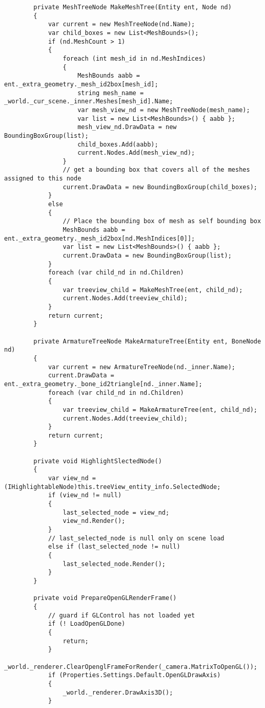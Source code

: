 \begin{scriptsize}
\begin{verbatim}
        private MeshTreeNode MakeMeshTree(Entity ent, Node nd)
        {
            var current = new MeshTreeNode(nd.Name);
            var child_boxes = new List<MeshBounds>();
            if (nd.MeshCount > 1)
            {
                foreach (int mesh_id in nd.MeshIndices)
                {
                    MeshBounds aabb = ent._extra_geometry._mesh_id2box[mesh_id];
                    string mesh_name = _world._cur_scene._inner.Meshes[mesh_id].Name;
                    var mesh_view_nd = new MeshTreeNode(mesh_name);
                    var list = new List<MeshBounds>() { aabb };
                    mesh_view_nd.DrawData = new BoundingBoxGroup(list);
                    child_boxes.Add(aabb);
                    current.Nodes.Add(mesh_view_nd);
                }
                // get a bounding box that covers all of the meshes assigned to this node
                current.DrawData = new BoundingBoxGroup(child_boxes);
            }
            else
            {
                // Place the bounding box of mesh as self bounding box
                MeshBounds aabb = ent._extra_geometry._mesh_id2box[nd.MeshIndices[0]];
                var list = new List<MeshBounds>() { aabb };
                current.DrawData = new BoundingBoxGroup(list);
            }
            foreach (var child_nd in nd.Children)
            {
                var treeview_child = MakeMeshTree(ent, child_nd);
                current.Nodes.Add(treeview_child);
            }
            return current;
        }

        private ArmatureTreeNode MakeArmatureTree(Entity ent, BoneNode nd)
        {
            var current = new ArmatureTreeNode(nd._inner.Name);
            current.DrawData = ent._extra_geometry._bone_id2triangle[nd._inner.Name];
            foreach (var child_nd in nd.Children)
            {
                var treeview_child = MakeArmatureTree(ent, child_nd);
                current.Nodes.Add(treeview_child);
            }
            return current;
        }

        private void HighlightSlectedNode()
        {
            var view_nd = (IHighlightableNode)this.treeView_entity_info.SelectedNode;
            if (view_nd != null)
            {
                last_selected_node = view_nd;
                view_nd.Render();
            }
            // last_selected_node is null only on scene load
            else if (last_selected_node != null)
            {
                last_selected_node.Render();
            }
        }

        private void PrepareOpenGLRenderFrame()
        {
            // guard if GLControl has not loaded yet
            if (! LoadOpenGLDone)
            {
                return;
            }
            _world._renderer.ClearOpenglFrameForRender(_camera.MatrixToOpenGL());
            if (Properties.Settings.Default.OpenGLDrawAxis)
            {
                _world._renderer.DrawAxis3D();
            }


\end{verbatim}
\end{scriptsize}
